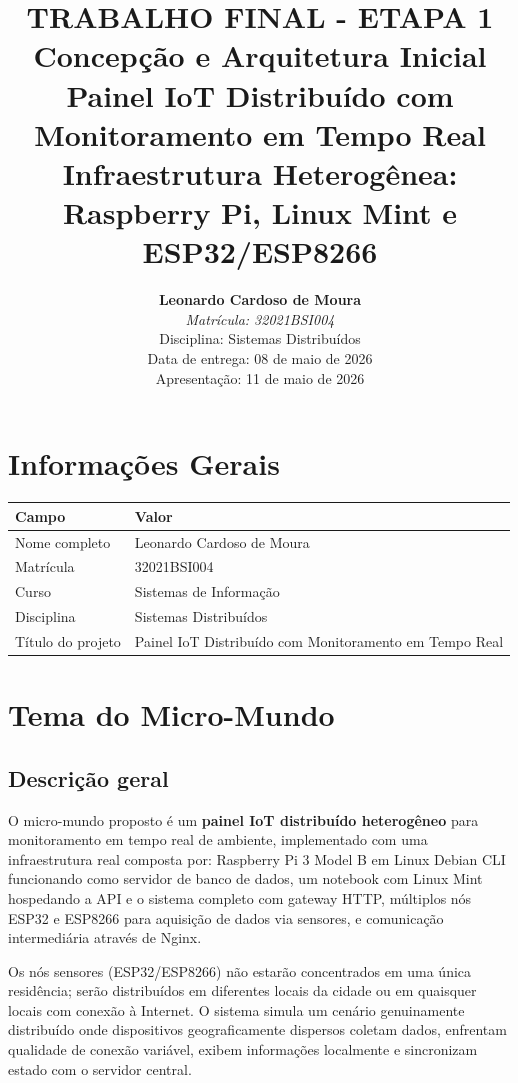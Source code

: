 \documentclass[12pt,a4paper,oneside]{report}
\title{
    \vspace{-1.5cm}
    {\Large \textbf{TRABALHO FINAL - ETAPA 1}}\\
    \vspace{0.4cm}
    {\LARGE \textbf{Concepção e Arquitetura Inicial}}\\
    \vspace{0.8cm}
    {\Large \textbf{Painel IoT Distribuído com Monitoramento em Tempo Real}}\\
    \vspace{0.8cm}
    {\large Infraestrutura Heterogênea: Raspberry Pi, Linux Mint e ESP32/ESP8266}\\
    \vspace{1.2cm}
}
\author{
    \textbf{Leonardo Cardoso de Moura}\\
    \textit{Matrícula: 32021BSI004}\\
    \vspace{0.3cm}
    Disciplina: Sistemas Distribuídos\\
    Data de entrega: 08 de maio de 2026\\
    Apresentação: 11 de maio de 2026
}
\date{}
\begin{document}
\maketitle
\thispagestyle{empty}
\newpage
\tableofcontents
\newpage

\chapter{Informações Gerais}

\begin{center}
\begin{tabular}{|p{5cm}|p{9cm}|}
\hline
\rowcolor{primary}
\color{white}\textbf{Campo} & \color{white}\textbf{Valor} \\
\hline
Nome completo & Leonardo Cardoso de Moura \\
\hline
Matrícula & 32021BSI004 \\
\hline
Curso & Sistemas de Informação \\
\hline
Disciplina & Sistemas Distribuídos \\
\hline
Título do projeto & Painel IoT Distribuído com Monitoramento em Tempo Real \\
\hline
\end{tabular}
\end{center}

\chapter{Tema do Micro-Mundo}

\section{Descrição geral}
O micro-mundo proposto é um \textbf{painel IoT distribuído heterogêneo} para monitoramento em tempo real de ambiente, implementado com uma infraestrutura real composta por: Raspberry Pi 3 Model B em Linux Debian CLI funcionando como servidor de banco de dados, um notebook com Linux Mint hospedando a API e o sistema completo com gateway HTTP, múltiplos nós ESP32 e ESP8266 para aquisição de dados via sensores, e comunicação intermediária através de Nginx.

Os nós sensores (ESP32/ESP8266) não estarão concentrados em uma única residência; serão distribuídos em diferentes locais da cidade ou em quaisquer locais com conexão à Internet. O sistema simula um cenário genuinamente distribuído onde dispositivos geograficamente dispersos coletam dados, enfrentam qualidade de conexão variável, exibem informações localmente e sincronizam estado com o servidor central.
\end{document}
